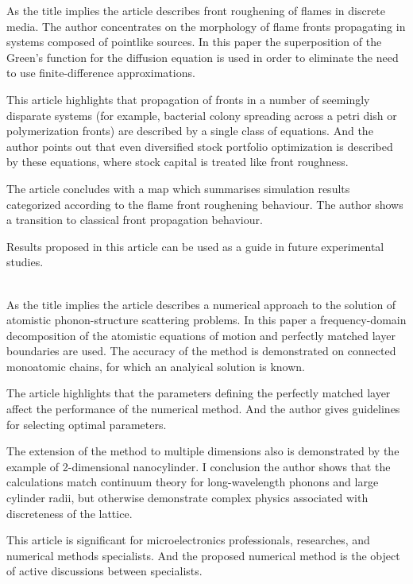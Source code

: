 \documentclass[main.tex]{subfiles}
\begin{document}
\setcounter{subsection}{4}
As the title implies the article describes front roughening of flames in discrete media.
The author concentrates on the morphology of flame fronts propagating in systems composed of pointlike sources.
In this paper the superposition of the Green's function for the diffusion equation is used in order to eliminate the need to use finite-difference approximations.\par
This article highlights that propagation of fronts in a number of seemingly disparate systems (for example, bacterial colony spreading across a petri dish or polymerization fronts) are described by a single class of equations.
And the author points out that even diversified stock portfolio optimization is described by these equations, where stock capital is treated like front roughness.\par
The article concludes with a map which summarises simulation results categorized according to the flame front roughening behaviour.
The author shows a transition to classical front propagation behaviour.\par
Results proposed in this article can be used as a guide in future experimental studies.
\ \\\\
\newpage


\setcounter{subsection}{5}
As the title implies the article describes a numerical approach to the solution of atomistic phonon-structure scattering problems.
In this paper a frequency-domain decomposition of the atomistic equations of motion and perfectly matched layer boundaries are used.
The accuracy of the method is demonstrated on connected monoatomic chains, for which an analyical solution is known.\par
The article highlights that the parameters defining the perfectly matched layer affect the performance of the numerical method.
And the author gives guidelines for selecting optimal parameters.\par
The extension of the method to multiple dimensions also is demonstrated by the example of 2-dimensional nanocylinder.
I conclusion the author shows that the calculations match continuum theory for long-wavelength phonons and large cylinder radii, but otherwise demonstrate complex physics associated with discreteness of the lattice.\par
This article is significant for microelectronics professionals, researches, and numerical methods specialists.
And the proposed numerical method is the object of active discussions between specialists.
\ \\\\
\newpage
\end{document}
